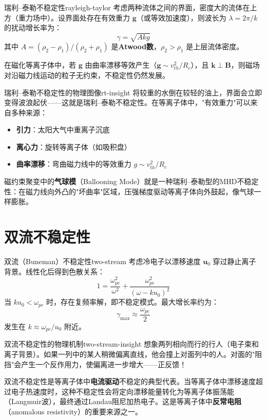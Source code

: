 \documentclass[12pt,a4paper,openany,oneside]{book}
\newcommand{\vect}[1]{\bm{#1}}
\newcommand{\difficulty}[1]{\marginnote{\textcolor{red}{\textbf{[#1]}}}}
\begin{document}
\begin{theorem}{瑞利--泰勒不稳定性}{rayleigh-taylor}
考虑两种流体之间的界面，密度大的流体在上方（重力场中）。设界面处存在有效重力 $\vect{g}$（或等效加速度），则波长为 $\lambda = 2\pi/k$ 的扰动增长率为：
\[
\gamma = \sqrt{A k g}
\]
其中 $A = (\rho_2 - \rho_1)/(\rho_2 + \rho_1)$ 是\textbf{Atwood数}，$\rho_2 > \rho_1$ 是上层流体密度。

在磁化等离子体中，若 $\vect{g}$ 由曲率漂移等效产生（$\vect{g} \sim v_{th}^2/R_c$），且 $\vect{k}\perp\vect{B}$，则磁场对沿磁力线运动的粒子无约束，不稳定性仍然发展。
\end{theorem}

\begin{insight}{瑞利--泰勒不稳定性的物理图像}{rt-insight}
将较重的水倒在较轻的油上，界面会立即变得波浪起伏——这就是瑞利--泰勒不稳定性。在等离子体中，"有效重力"可以来自多种来源：
\begin{itemize}
\item \textbf{引力}：太阳大气中重离子沉底
\item \textbf{离心力}：旋转等离子体（如吸积盘）
\item \textbf{曲率漂移}：弯曲磁力线中的等效重力 $g \sim v_{th}^2/R_c$
\end{itemize}

磁约束聚变中的\textbf{气球模}（Ballooning Mode）就是一种瑞利--泰勒型的MHD不稳定性：在磁力线向外凸的"坏曲率"区域，压强梯度驱动等离子体向外鼓起，像气球一样膨胀。
\end{insight}

\section{双流不稳定性}\difficulty{提高}

\begin{theorem}{双流（Buneman）不稳定性}{two-stream}
考虑冷电子以漂移速度 $\vect{u}_0$ 穿过静止离子背景。线性化后得到色散关系：
\[
1 = \frac{\omega_{pe}^2}{\omega^2} + \frac{\omega_{pe}^2}{(\omega - k u_0)^2}
\]
当 $k u_0 < \omega_{pe}$ 时，存在复频率解，即不稳定模式。最大增长率约为：
\[
\gamma_{\max} \approx \frac{\omega_{pe}}{2}
\]
发生在 $k \approx \omega_{pe}/u_0$ 附近。
\end{theorem}

\begin{insight}{双流不稳定性的物理机制}{two-stream-insight}
想象两列相向而行的行人（电子束和离子背景）。如果一列中的某人稍微偏离直线，他会撞上对面列中的人。对面的"阻挡"会产生一个反作用力，使偏离进一步增大——正反馈！

双流不稳定性是等离子体中\textbf{电流驱动}不稳定的典型代表。当等离子体中漂移速度超过电子热速度时，这种不稳定性会将定向漂移能量转化为等离子体振荡能（Langmuir波），最终通过Landau阻尼加热电子。这是等离子体中\textbf{反常电阻}（anomalous resistivity）的重要来源之一。
\end{insight}
\end{document}
